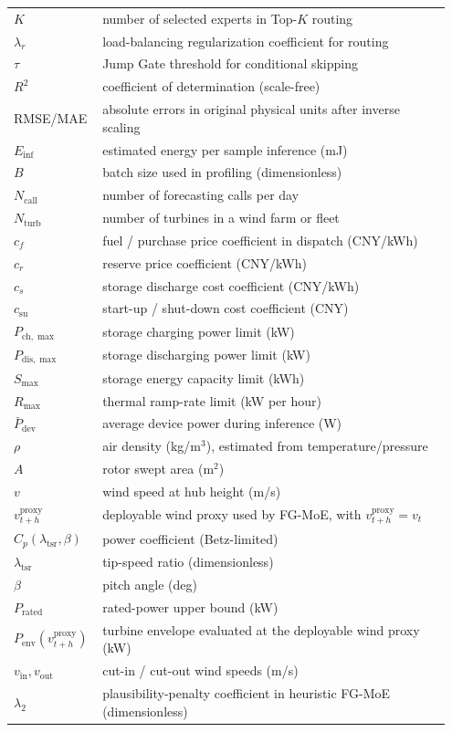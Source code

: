 ﻿\documentclass[review,1p,times]{elsarticle}
\begin{document}
\begin{longtable}{@{}p{0.17\linewidth}L{0.78\linewidth}@{}}
$K$ & number of selected experts in Top-$K$ routing \\
$\lambda_r$ & load-balancing regularization coefficient for routing \\
$\tau$ & Jump Gate threshold for conditional skipping \\
$R^2$ & coefficient of determination (scale-free) \\
RMSE/MAE & absolute errors in original physical units after inverse scaling \\
$E_{\text{inf}}$ & estimated energy per sample inference (mJ) \\
$B$ & batch size used in profiling (dimensionless) \\
$N_{\text{call}}$ & number of forecasting calls per day \\
$N_{\text{turb}}$ & number of turbines in a wind farm or fleet \\
$c_f$ & fuel / purchase price coefficient in dispatch (CNY/kWh) \\
$c_r$ & reserve price coefficient (CNY/kWh) \\
$c_s$ & storage discharge cost coefficient (CNY/kWh) \\
$c_{\text{su}}$ & start-up / shut-down cost coefficient (CNY) \\
$P_{\text{ch},\max}$ & storage charging power limit (kW) \\
$P_{\text{dis},\max}$ & storage discharging power limit (kW) \\
$S_{\max}$ & storage energy capacity limit (kWh) \\
$R_{\max}$ & thermal ramp-rate limit (kW per hour) \\
$\bar{P}_{\text{dev}}$ & average device power during inference (W) \\
$\rho$ & air density (kg/m$^3$), estimated from temperature/pressure \\
$A$ & rotor swept area (m$^2$) \\
$v$ & wind speed at hub height (m/s) \\
$v_{t+h}^{\mathrm{proxy}}$ & deployable wind proxy used by FG-MoE, with $v_{t+h}^{\mathrm{proxy}}=v_t$ \\
$C_p(\lambda_{\mathrm{tsr}},\beta)$ & power coefficient (Betz-limited) \\
$\lambda_{\mathrm{tsr}}$ & tip-speed ratio (dimensionless) \\
$\beta$ & pitch angle (deg) \\
$P_{\mathrm{rated}}$ & rated-power upper bound (kW) \\
$P_{\mathrm{env}}(v_{t+h}^{\mathrm{proxy}})$ & turbine envelope evaluated at the deployable wind proxy (kW) \\
$v_{\mathrm{in}}, v_{\mathrm{out}}$ & cut-in / cut-out wind speeds (m/s) \\
$\lambda_2$ & plausibility-penalty coefficient in heuristic FG-MoE (dimensionless) \\
\end{longtable}
\linenumbers
\endgroup
\end{document}
